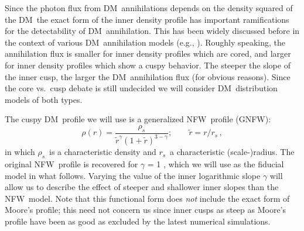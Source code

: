 \documentclass[aps,prd,twocolumn,amsmath,amssymb,floatfix,nofootinbib,10pt]{revtex4}
\newcommand{\eg}{e.g.}
\newcommand{\NFW}{NFW}
\newcommand{\GNFW}{G\NFW}
\newcommand{\DM}{DM}
\newcommand{\redr}{\ensuremath{\tilde{r}}}
\newcommand{\rhos}{\ensuremath{\rho_s}}
\newcommand{\rs}{\ensuremath{r_s}}
\begin{document}
Since the photon flux from \DM\ annihilations depends on the density
squared of the \DM\, the exact form of the inner density profile has
important ramifications for the detectability of \DM\
annihilation. This has been widely discussed before in the context of
various \DM\ annihilation models (\eg,
\cite{1998APh.....9..137B,1999PhRvL..83.1719G,2000PhRvD..62l3005C,2000PhLB..494..181G,2002PhRvD..66b3509T,2002PhRvD..66l3502U,2003MNRAS.339..505T,2004ApJ...601...47A,2008JCAP...07..013B,2008arXiv0811.3744B,2008arXiv0812.3895B}). Roughly
speaking, the annihilation flux is smaller for inner density profiles
which are cored, and larger for inner density profiles which show a
cuspy behavior. The steeper the slope of the inner cusp, the larger
the \DM\ annihilation flux (for obvious reasons). Since the core
vs.~cusp debate is still undecided we will consider \DM\ distribution
models of both types.

The cuspy \DM\ profile we will use is a generalized \NFW\ profile (\GNFW):
\begin{equation}\label{eq:NFW}
\rho(r) = \frac{\rhos}{\redr^\gamma\left(1+\redr\right)^{3-\gamma}};\qquad \redr = r/\rs\, ,
\end{equation}
in which \rhos\ is a characteristic density and \rs\ a characteristic
(scale-)radius.  The original \NFW\ profile is recovered for $\gamma$
= 1 \cite{1997ApJ...490..493N}, which we will use as the fiducial
model in what follows. Varying the value of the inner logarithmic
slope $\gamma$ will allow us to describe the effect of steeper and
shallower inner slopes than the \NFW\ model. Note that this functional
form does \emph{not} include the exact form of Moore's profile; this
need not concern us since inner cusps as steep as Moore's profile have
been as good as excluded by the latest numerical simulations.
\end{document}
